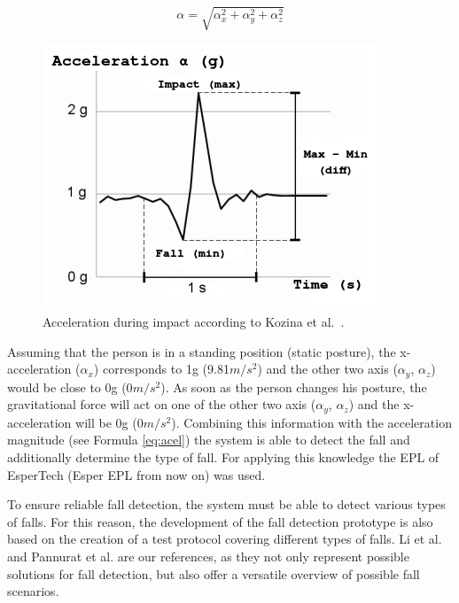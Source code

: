 \documentclass[10pt,journal,compsoc]{IEEEtran}
\begin{document}
\begin{equation}\label{eq:acel}
\alpha = \sqrt{\alpha_{x}^{2} + \alpha_{y}^{2} + \alpha_{z}^{2}}
\end{equation}

\begin{figure}[!ht]
	\centering
	\includegraphics[scale=0.5]{Images/FallGraph}
	\caption[Acceleration during impact]{Acceleration during impact according to Kozina et al.~\cite{Kozina}.}
	\label{fig:fallKozina}
\end{figure}
 Assuming that the person is in a standing position (static posture), the x-acceleration ($\alpha_x$) corresponds to 1g (9.81$m/s^{2}$) and the other two axis ($\alpha_y$, $\alpha_z$) would be close to 0g (0$m/s^{2}$). As soon as the person changes his posture, the gravitational force will act on one of the other two axis ($\alpha_y$, $\alpha_z$) and the x-acceleration will be 0g (0$m/s^{2}$). Combining this information with the acceleration magnitude (see Formula \ref{eq:acel}) the system is able to detect the fall and additionally determine the type of fall. For applying this knowledge the EPL of EsperTech (Esper EPL from now on) \cite{Esper:2016} was used.

To ensure reliable fall detection, the system must be able to detect various types of falls. For this reason, the development of the fall detection prototype is also based on the creation of a test protocol covering different types of falls. Li et al. \cite{Li2009} and Pannurat et al. \cite{Pannurat2014} are our references, as they not only represent possible solutions for fall detection, but also offer a versatile overview of possible fall scenarios.
\end{document}
